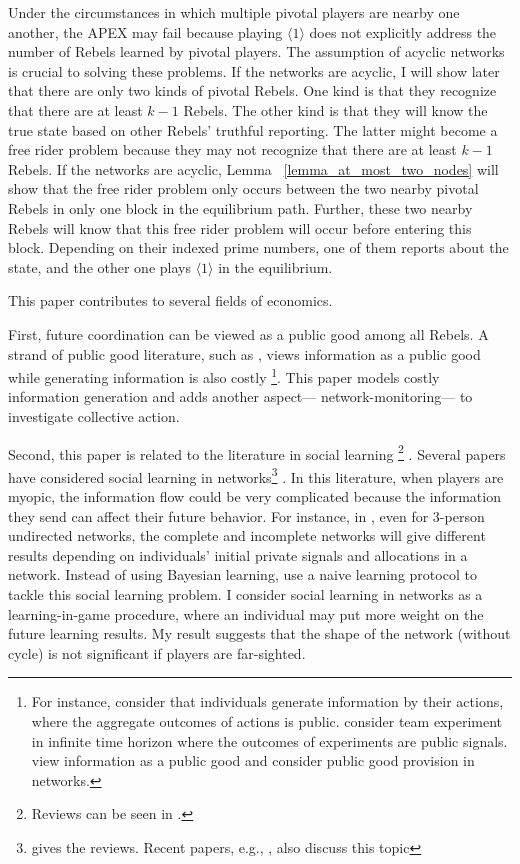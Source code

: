 \documentclass[12pt,letterpaper]{article}
\theoremstyle{definition}
\theoremstyle{remark}
\theoremstyle{claim}
\begin{document}
Under the circumstances in which multiple pivotal players are nearby one another, the APEX may fail because playing $\langle 1 \rangle$ does not explicitly address the number of Rebels learned by pivotal players. The assumption of acyclic networks is crucial to solving these problems. If the networks are acyclic, I will show later that there are only two kinds of pivotal Rebels. One kind is that they recognize that there are at least $k-1$ Rebels. The other kind is that they will know the true state based on other Rebels' truthful reporting. The latter might become a free rider problem because they may not recognize that there are at least $k-1$ Rebels.  If the networks are acyclic, Lemma ~\ref{lemma_at_most_two_nodes} will show that the free rider problem only occurs between the two nearby pivotal Rebels in only one block in the equilibrium path. Further, these two nearby Rebels will know that this free rider problem will occur before entering this block. Depending on their indexed prime numbers, one of them reports about the state, and the other one plays $\langle 1 \rangle$ in the equilibrium. 






This paper contributes to several fields of economics. 


First, future coordination can be viewed as a public good among all Rebels. A strand of public good literature, such as \citep{Lohmann1994}, views information as a public good while generating information is also costly \footnote{For instance, \citep{Lohmann1993}\citep{Lohmann1994} consider that individuals generate information by their actions, where the aggregate outcomes of actions is public. \citep{Bolto_Harris1999} consider team experiment in infinite time horizon where the outcomes of experiments are public signals. \citep{Bramoulle2007} view information as a public good and consider public good provision in networks.}. This paper models costly information generation and adds another aspect--- network-monitoring--- to investigate collective action.


Second, this paper is related to the literature in social learning \footnote{Reviews can be seen in \citep{Bikhchandani1998} \citep{Cao2001}.} . Several papers have considered social learning in networks\footnote{\citep{Goyal2012} gives the reviews. Recent papers, e.g., \citep{Acemoglu2011}\citep{Chatterjee2011}, also discuss this topic} . In this literature, when players are myopic, the information flow could be very complicated because the information they send can affect their future behavior. For instance, in \citep{RePEc:eee:gamebe:v:45:y:2003:i:2:p:329-346}, even for 3-person undirected networks, the complete and incomplete networks will give different results depending on individuals' initial private signals and allocations in a network. Instead of using Bayesian learning, \citep{Golub2010} use a naive learning protocol to tackle this social learning problem. I consider social learning in networks as a learning-in-game procedure, where an individual may put more weight on the future learning results. My result suggests that the shape of the network (without cycle) is not significant if players are far-sighted.
\end{document}
